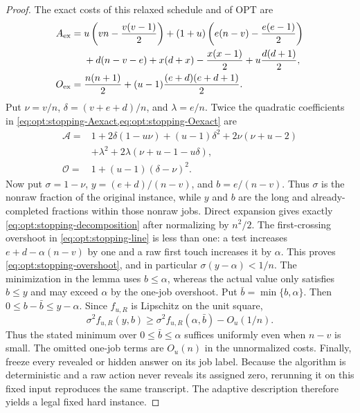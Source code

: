 \begin{proof}
The exact costs of this relaxed schedule and of OPT are
\begin{align}
 A_{\rm ex}={}&
 u\left(vn-\frac{v(v-1)}2\right)
 +(1+u)\left(e(n-v)-\frac{e(e-1)}2\right) \notag\\
 &+d(n-v-e)+x(d+x)-\frac{x(x-1)}2
 +u\frac{d(d+1)}2,
 \label{eq:opt:stopping-Aexact}\\
 O_{\rm ex}={}&\frac{n(n+1)}2
 +(u-1)\frac{(e+d)(e+d+1)}2.
 \label{eq:opt:stopping-Oexact}
\end{align}
Put $\nu=v/n$, $\delta=(v+e+d)/n$, and $\lambda=e/n$.  Twice the quadratic
coefficients in \cref{eq:opt:stopping-Aexact,eq:opt:stopping-Oexact} are
\begin{align*}
 \mathcal A={}&1+2\delta(1-u\nu)+(u-1)\delta^2
 +2\nu(\nu+u-2)\\
 &+\lambda^2+2\lambda(\nu+u-1-u\delta),\\
 \mathcal O={}&1+(u-1)(\delta-\nu)^2.
\end{align*}
Now put $\sigma=1-\nu$, $y=(e+d)/(n-v)$, and $b=e/(n-v)$.
Thus $\sigma$ is the nonraw fraction of the original instance, while $y$ and
$b$ are the long and already-completed fractions within those nonraw jobs.
Direct expansion gives exactly \cref{eq:opt:stopping-decomposition} after
normalizing by $n^2/2$.  The first-crossing overshoot in
\cref{eq:opt:stopping-line} is less than one: a test increases
$e+d-\alpha(n-v)$ by one and a raw first touch increases it by $\alpha$.
This proves \cref{eq:opt:stopping-overshoot}, and in particular
$\sigma(y-\alpha)<1/n$.  The minimization in the lemma uses
$b\le\alpha$, whereas the actual value only satisfies $b\le y$ and may exceed
$\alpha$ by the one-job overshoot.  Put $\bar b=\min\{b,\alpha\}$.  Then
$0\le b-\bar b\le y-\alpha$.  Since $f_{u,R}$ is Lipschitz on the unit
square,
\begin{equation}
 \sigma^2 f_{u,R}(y,b)
 \ge \sigma^2 f_{u,R}(\alpha,\bar b)-O_u(1/n).
\end{equation}
Thus the stated minimum over $0\le\bar b\le\alpha$ suffices uniformly even
when $n-v$ is small.  The omitted one-job terms are $O_u(n)$ in the
unnormalized costs.
Finally, freeze every revealed or hidden answer on its job label.  Because
the algorithm is deterministic and a raw action never reveals its assigned
zero, rerunning it on this fixed input reproduces the same transcript.  The
adaptive description therefore yields a legal fixed hard instance.
\end{proof}

